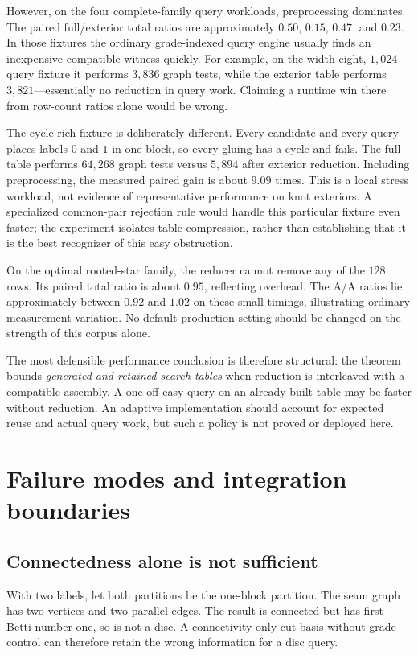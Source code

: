 \documentclass[11pt,a4paper]{article}
\theoremstyle{remark}\newtheorem{remark}[theorem]{Remark}
\begin{document}
However, on the four complete-family query workloads, preprocessing dominates. The paired full/exterior total ratios are approximately $0.50$, $0.15$, $0.47$, and $0.23$. In those fixtures the ordinary grade-indexed query engine usually finds an inexpensive compatible witness quickly. For example, on the width-eight, $1{,}024$-query fixture it performs $3{,}836$ graph tests, while the exterior table performs $3{,}821$---essentially no reduction in query work. Claiming a runtime win there from row-count ratios alone would be wrong.

The cycle-rich fixture is deliberately different. Every candidate and every query places labels $0$ and $1$ in one block, so every gluing has a cycle and fails. The full table performs $64{,}268$ graph tests versus $5{,}894$ after exterior reduction. Including preprocessing, the measured paired gain is about $9.09$ times. This is a local stress workload, not evidence of representative performance on knot exteriors. A specialized common-pair rejection rule would handle this particular fixture even faster; the experiment isolates table compression, rather than establishing that it is the best recognizer of this easy obstruction.

On the optimal rooted-star family, the reducer cannot remove any of the $128$ rows. Its paired total ratio is about $0.95$, reflecting overhead. The A/A ratios lie approximately between $0.92$ and $1.02$ on these small timings, illustrating ordinary measurement variation. No default production setting should be changed on the strength of this corpus alone.

The most defensible performance conclusion is therefore structural: the theorem bounds \emph{generated and retained search tables} when reduction is interleaved with a compatible assembly. A one-off easy query on an already built table may be faster without reduction. An adaptive implementation should account for expected reuse and actual query work, but such a policy is not proved or deployed here.

\section{Failure modes and integration boundaries}\label{sec:limits}
\subsection{Connectedness alone is not sufficient}
With two labels, let both partitions be the one-block partition. The seam graph has two vertices and two parallel edges. The result is connected but has first Betti number one, so is not a disc. A connectivity-only cut basis without grade control can therefore retain the wrong information for a disc query.
\end{document}
